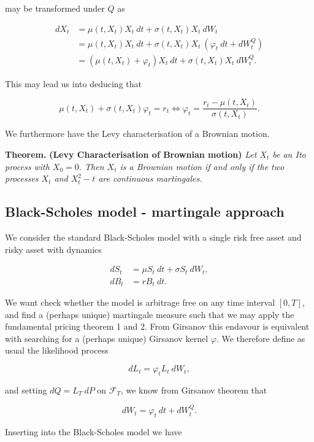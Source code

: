 \documentclass[
]{article}
\begin{document}
may be transformed under \(Q\) as

\begin{align*}
dX_t&=\mu(t,X_t)X_t\ dt+\sigma(t,X_t) X_t\ dW_t\\
&=\mu(t,X_t)X_t\ dt+\sigma(t,X_t) X_t\ (\varphi_t\ dt+dW_t^Q)\\
&=\left(\mu(t,X_t) + \varphi_t\right) X_t\ dt + \sigma(t,X_t)X_t\ dW_t^Q.
\end{align*}

This may lead us into deducing that

\[
\mu(t,X_t)+\sigma(t,X_t)\varphi_t=r_t\iff\varphi_t=\frac{r_t-\mu(t,X_t)}{\sigma(t,X_t)}.
\]

We furthermore have the Levy characterisation of a Brownian motion.

\textbf{Theorem.} \textbf{(Levy Characterisation of Brownian motion)}
\emph{Let \(X_t\) be an Ito process with \(X_0=0\). Then \(X_t\) is a
Brownian motion if and only if the two processes \(X_t\) and \(X_t^2-t\)
are continuous martingales.}

\hypertarget{black-scholes-model---martingale-approach}{%
\subsection{Black-Scholes model - martingale
approach}\label{black-scholes-model---martingale-approach}}

We consider the standard Black-Scholes model with a single risk free
asset and risky asset with dynamics

\begin{align*}
dS_t &= \mu S_t\ dt+\sigma S_t\ dW_t,\tag{13.1}\\
dB_t &= r B_t\ dt.\tag{13.2}
\end{align*}

We want check whether the model is arbitrage free on any time interval
\([0,T]\), and find a (perhaps unique) martingale measure such that we
may apply the fundamental pricing theorem 1 and 2. From Girsanov this
endavour is equivalent with searching for a (perhaps unique) Girsanov
kernel \(\varphi\). We therefore define as usual the likelihood process

\[
dL_t=\varphi_ tL_t\ dW_t,
\]

and setting \(dQ=L_T\ dP\) on \(\mathcal{F}_T\), we know from Girsanov
theorem that

\[
dW_t=\varphi_t\ dt+dW_t^Q.
\]

Inserting into the Black-Scholes model we have
\end{document}
